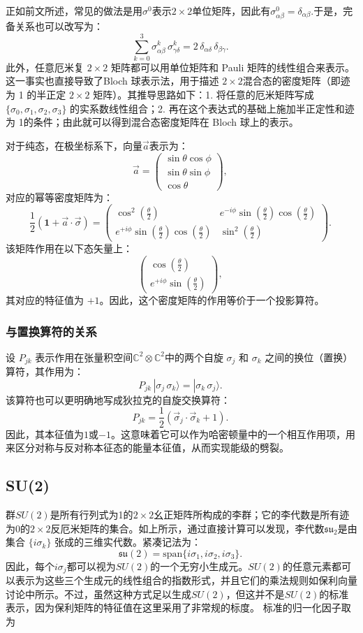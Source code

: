 正如前文所述，常见的做法是用$\sigma^0$表示$2 \times 2$单位矩阵，因此有$\sigma^0_{\alpha\beta} = \delta_{\alpha\beta}$.于是，完备关系也可以改写为：
$$
\sum_{k=0}^{3} \sigma^k_{\alpha\beta} \, \sigma^k_{\gamma\delta} = 2\, \delta_{\alpha\delta}\, \delta_{\beta\gamma}.~
$$
此外，任意厄米复 $2 \times 2$ 矩阵都可以用单位矩阵和 Pauli 矩阵的线性组合来表示。这一事实也直接导致了Bloch 球表示法，用于描述 $2 \times 2$混合态的密度矩阵（即迹为 1 的半正定 $2 \times 2$ 矩阵）。其推导思路如下：1. 将任意的厄米矩阵写成 $\{\sigma_0, \sigma_1, \sigma_2, \sigma_3\}$ 的实系数线性组合；2. 再在这个表达式的基础上施加半正定性和迹为 1的条件；由此就可以得到混合态密度矩阵在 Bloch 球上的表示。

对于纯态，在极坐标系下，向量$\vec{a}$表示为：
$$
\vec{a} =
\begin{pmatrix}
\sin\theta \cos\phi \\
\sin\theta \sin\phi \\
\cos\theta
\end{pmatrix},~
$$
对应的幂等密度矩阵为：
$$
\frac{1}{2} \left(\mathbf{1} + \vec{a} \cdot \vec{\sigma}\right)
=
\begin{pmatrix}
\cos^2\left(\frac{\theta}{2}\right) & e^{-i\phi}\sin\left(\frac{\theta}{2}\right)\cos\left(\frac{\theta}{2}\right) \\
e^{+i\phi}\sin\left(\frac{\theta}{2}\right)\cos\left(\frac{\theta}{2}\right) & \sin^2\left(\frac{\theta}{2}\right)
\end{pmatrix}.~
$$
该矩阵作用在以下态矢量上：
$$
\begin{pmatrix}
\cos\left(\frac{\theta}{2}\right) \\
e^{+i\phi}\sin\left(\frac{\theta}{2}\right)
\end{pmatrix},~
$$
其对应的特征值为 $+1$。因此，这个密度矩阵的作用等价于一个投影算符。
\subsubsection{与置换算符的关系}
设 $P_{jk}$ 表示作用在张量积空间$\mathbb{C}^2 \otimes \mathbb{C}^2$中的两个自旋 $\sigma_j$ 和 $\sigma_k$ 之间的换位（置换）算符，其作用为：
$$
P_{jk} \, |\sigma_j \, \sigma_k \rangle = |\sigma_k \, \sigma_j \rangle.~
$$
该算符也可以更明确地写成狄拉克的自旋交换算符：
$$
P_{jk} = \frac{1}{2} \left( \vec{\sigma}_j \cdot \vec{\sigma}_k + 1 \right).~
$$
因此，其本征值为$1$或$-1$。这意味着它可以作为哈密顿量中的一个相互作用项，用来区分对称与反对称本征态的能量本征值，从而实现能级的劈裂。
\subsection{SU(2)}
群$SU(2)$是所有行列式为1的$2\times2$幺正矩阵所构成的李群；它的李代数是所有迹为0的$2\times2$反厄米矩阵的集合。如上所示，通过直接计算可以发现，李代数$\mathfrak{su}_2$是由集合 $\{ i\sigma_k \}$ 张成的三维实代数。紧凑记法为：
$$
\mathfrak{su}(2) = \text{span} \{ i\sigma_1, i\sigma_2, i\sigma_3 \}.
~
$$
因此，每个$i\sigma_j$都可以视为$SU(2)$的一个无穷小生成元。$SU(2)$的任意元素都可以表示为这些三个生成元的线性组合的指数形式，并且它们的乘法规则如保利向量讨论中所示。不过，虽然这种方式足以生成$SU(2)$，但这并不是$SU(2)$的标准表示，因为保利矩阵的特征值在这里采用了非常规的标度。
标准的归一化因子取为

